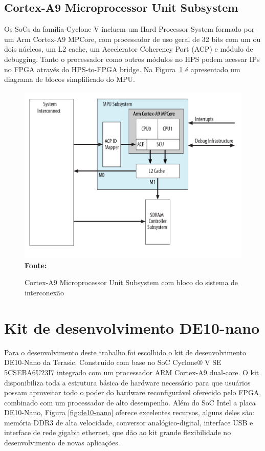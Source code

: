 \subsection{Cortex-A9 Microprocessor Unit Subsystem}
Os SoCs da família Cyclone V incluem um Hard Processor System formado por um Arm Cortex-A9 MPCore, com processador de uso geral de 32 bits com um ou dois núcleos, um L2 cache, um Accelerator Coherency Port (ACP) e módulo de debugging. Tanto o processador como outros módulos no HPS podem acessar IPs no FPGA através do HPS-to-FPGA bridge. Na Figura~\ref{fig:mpusubsystem} é apresentado um diagrama de blocos simplificado do MPU.
\begin{figure}[ht]
	\caption{Cortex-A9 Microprocessor Unit Subsystem com bloco do sistema de interconexão}
	\begin{center}
		\includegraphics[scale=0.37]{imagens/mpusubsystem.png}\\
		{\small \textbf{Fonte:} }
    \end{center}\label{fig:mpusubsystem}
\end{figure}


\section{Kit de desenvolvimento DE10-nano}

Para o desenvolvimento deste trabalho foi escolhido o kit de desenvolvimento DE10-Nano da Terasic. Construído com base no SoC Cyclone® V SE 5CSEBA6U23I7 integrado com um processador ARM Cortex-A9 dual-core. O kit disponibiliza toda a estrutura básica de hardware necessário para que usuários possam aproveitar todo o poder do hardware reconfigurável oferecido pelo FPGA, combinado com um processador de alto desempenho. Além do SoC Intel a placa DE10-Nano, Figura \ref{fig:de10-nano} oferece excelentes recursos, alguns deles são: memória DDR3 de alta velocidade, conversor analógico-digital, interface USB e interface de rede gigabit ethernet, que dão ao kit grande flexibilidade no desenvolvimento de novas aplicações. 


